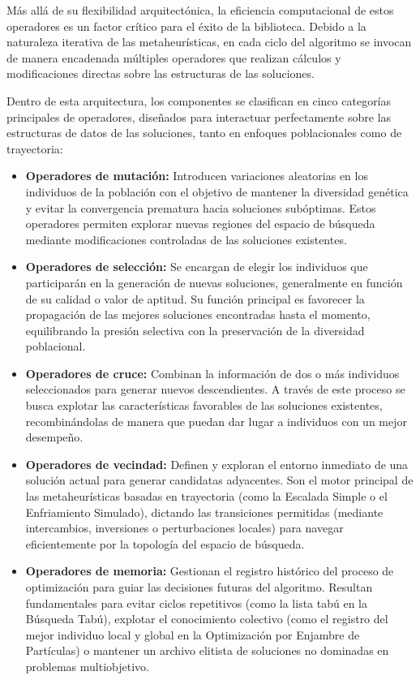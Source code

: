 \documentclass[12pt,a4paper,twoside,openright]{book}
\begin{document}
        Más allá de su flexibilidad arquitectónica, la eficiencia computacional de estos operadores es un factor crítico para el éxito de la biblioteca. Debido a la naturaleza iterativa de las metaheurísticas, en cada ciclo del algoritmo se invocan de manera encadenada múltiples operadores que realizan cálculos y modificaciones directas sobre las estructuras de las soluciones.

        Dentro de esta arquitectura, los componentes se clasifican en cinco categorías principales de operadores, diseñados para interactuar perfectamente sobre las estructuras de datos de las soluciones, tanto en enfoques poblacionales como de trayectoria:
    
    \begin{itemize}
        \item \textbf{Operadores de mutación:} Introducen variaciones aleatorias en los individuos de la población con el objetivo de mantener la diversidad genética y evitar la convergencia prematura hacia soluciones subóptimas. Estos operadores permiten explorar nuevas regiones del espacio de búsqueda mediante modificaciones controladas de las soluciones existentes.
            
        \item \textbf{Operadores de selección:} Se encargan de elegir los individuos que participarán en la generación de nuevas soluciones, generalmente en función de su calidad o valor de aptitud. Su función principal es favorecer la propagación de las mejores soluciones encontradas hasta el momento, equilibrando la presión selectiva con la preservación de la diversidad poblacional.
            
        \item \textbf{Operadores de cruce:} Combinan la información de dos o más individuos seleccionados para generar nuevos descendientes. A través de este proceso se busca explotar las características favorables de las soluciones existentes, recombinándolas de manera que puedan dar lugar a individuos con un mejor desempeño.
        
        \item \textbf{Operadores de vecindad:} Definen y exploran el entorno inmediato de una solución actual para generar candidatas adyacentes. Son el motor principal de las metaheurísticas basadas en trayectoria (como la Escalada Simple o el Enfriamiento Simulado), dictando las transiciones permitidas (mediante intercambios, inversiones o perturbaciones locales) para navegar eficientemente por la topología del espacio de búsqueda.
        
        \item \textbf{Operadores de memoria:} Gestionan el registro histórico del proceso de optimización para guiar las decisiones futuras del algoritmo. Resultan fundamentales para evitar ciclos repetitivos (como la lista tabú en la Búsqueda Tabú), explotar el conocimiento colectivo (como el registro del mejor individuo local y global en la Optimización por Enjambre de Partículas) o mantener un archivo elitista de soluciones no dominadas en problemas multiobjetivo.
    \end{itemize}
\end{document}

